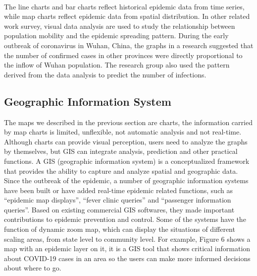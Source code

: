 \documentclass[sigplan,screen]{acmart}
\begin{document}
\\
The line charts and bar charts reflect historical epidemic data from time series, while map charts reflect epidemic data from spatial distribution.
In other related work survey, visual data analysis are used to study the relationship between population mobility and the epidemic spreading pattern.
During the early outbreak of coronavirus in Wuhan, China, the graphs in a research suggested that the number of confirmed cases in other provinces were directly proportional to the inflow of Wuhan population.
The research group also used the pattern derived from the data analysis to predict the number of infections.\cite{chen2020data}
\subsection{Geographic Information System}
The maps we described in the previous section are charts, the information carried by map charts is limited, unflexible, not automatic analysis and not real-time.
Although charts can provide visual perception, users need to analyze the graphs by themselves, but GIS can integrate analysis, prediction and other practical functions.
A GIS (geographic information system) is a conceptualized framework that provides the ability to capture and analyze spatial and geographic data\cite{clarke1986advances}.
Since the outbreak of the epidemic, a number of geographic information systems have been built or have added real-time epidemic related functions, such as ``epidemic map displays'', ``fever clinic queries'' and ``passenger information queries''.
Based on existing commercial GIS softwares, they made important contributions to epidemic prevention and control\cite{zhou2020covid}.
Some of the systems have the function of dynamic zoom map, which can display the situations of different scaling areas, from state level to community level.
For example, Figure 6 shows a map with an epidemic layer on it, it is a GIS tool that shows critical information about COVID-19 cases in an area so the users can make more informed decisions about where to go.
\end{document}

